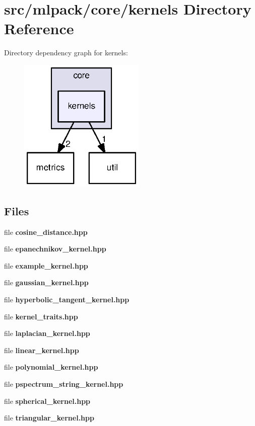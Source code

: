 \section{src/mlpack/core/kernels Directory Reference}
\label{dir_b554345f14f7af9192a000ede2774b80}
Directory dependency graph for kernels\+:
\nopagebreak
\begin{figure}[H]
\begin{center}
\leavevmode
\includegraphics[width=170pt]{dir_b554345f14f7af9192a000ede2774b80_dep}
\end{center}
\end{figure}
\subsection*{Files}
\begin{DoxyCompactItemize}
\item 
file {\bf cosine\+\_\+distance.\+hpp}
\item 
file {\bf epanechnikov\+\_\+kernel.\+hpp}
\item 
file {\bf example\+\_\+kernel.\+hpp}
\item 
file {\bf gaussian\+\_\+kernel.\+hpp}
\item 
file {\bf hyperbolic\+\_\+tangent\+\_\+kernel.\+hpp}
\item 
file {\bf kernel\+\_\+traits.\+hpp}
\item 
file {\bf laplacian\+\_\+kernel.\+hpp}
\item 
file {\bf linear\+\_\+kernel.\+hpp}
\item 
file {\bf polynomial\+\_\+kernel.\+hpp}
\item 
file {\bf pspectrum\+\_\+string\+\_\+kernel.\+hpp}
\item 
file {\bf spherical\+\_\+kernel.\+hpp}
\item 
file {\bf triangular\+\_\+kernel.\+hpp}
\end{DoxyCompactItemize}
